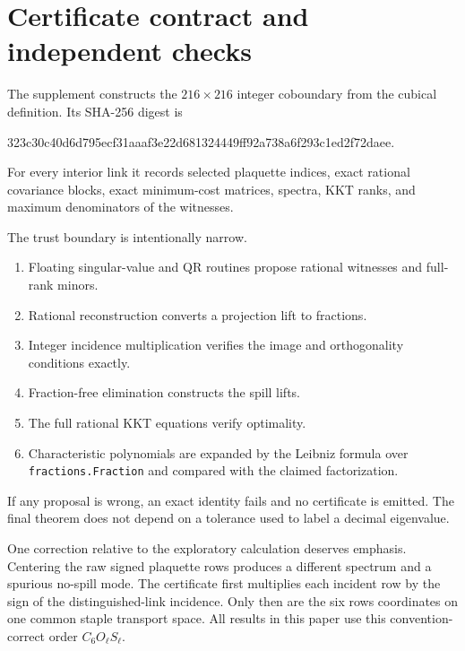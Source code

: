 \section{Certificate contract and independent checks}
\label{app:certificate}

The supplement constructs the $216\times216$ integer coboundary from the
cubical definition.  Its SHA-256 digest is
\begin{center}
\small\ttfamily
323c30c40d6d795ecf31aaaf3e22d681324449ff92a738a6f293c1ed2f72daee.
\end{center}
For every interior link it records selected plaquette indices, exact rational
covariance blocks, exact minimum-cost matrices, spectra, KKT ranks, and maximum
denominators of the witnesses.

The trust boundary is intentionally narrow.
\begin{enumerate}[label=(\arabic*)]
\item Floating singular-value and QR routines propose rational witnesses and
full-rank minors.
\item Rational reconstruction converts a projection lift to fractions.
\item Integer incidence multiplication verifies the image and orthogonality
conditions exactly.
\item Fraction-free elimination constructs the spill lifts.
\item The full rational KKT equations verify optimality.
\item Characteristic polynomials are expanded by the Leibniz formula over
\texttt{fractions.Fraction} and compared with the claimed factorization.
\end{enumerate}
If any proposal is wrong, an exact identity fails and no certificate is
emitted.  The final theorem does not depend on a tolerance used to label a
decimal eigenvalue.

One correction relative to the exploratory calculation deserves emphasis.
Centering the raw signed plaquette rows produces a different spectrum and a
spurious no-spill mode.  The certificate first multiplies each incident row by
the sign of the distinguished-link incidence.  Only then are the six rows
coordinates on one common staple transport space.  All results in this paper
use this convention-correct order $C_6O_\ell S_\ell$.
